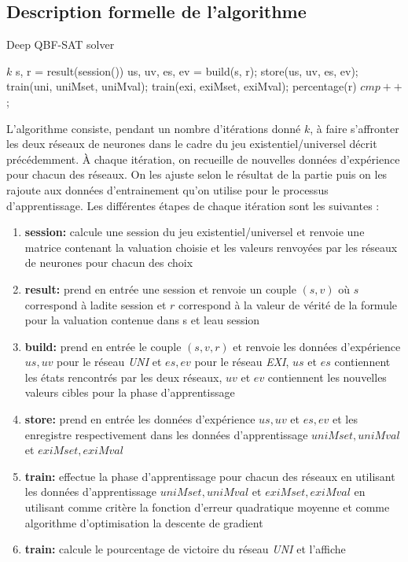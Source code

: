 \documentclass{article}
\begin{document}
\subsection{Description formelle de l'algorithme}
	\begin{algorithm}
	\caption{Deep QBF-SAT solver}
	\begin{algorithmic}
	\REQUIRE  $k$ 
	\STATE  s, r = result(session())
	\STATE  us, uv, es, ev = build(s, r);
	\STATE store(us, uv, es, ev);
	\STATE train(uni, uniMset, uniMval);
	\STATE train(exi, exiMset, exiMval);
	\STATE percentage(r)
	\STATE $cmp++$;
	\ENDWHILE
	\end{algorithmic}
	\end{algorithm}
	L'algorithme consiste, pendant un nombre d'itérations donné $k$, à faire s'affronter les deux réseaux de neurones dans le cadre du jeu existentiel/universel décrit précédemment. À chaque itération, on recueille de nouvelles données d'expérience pour chacun des réseaux. On les ajuste selon le résultat de la partie puis on les rajoute aux données d'entrainement qu'on utilise pour le processus d'apprentissage.
	Les différentes étapes de chaque itération sont les suivantes :
	\begin{enumerate}
	\item \textbf{session:} calcule une session du jeu existentiel/universel et renvoie une matrice contenant la valuation choisie et les valeurs renvoyées par les réseaux de neurones pour chacun des choix
	\item \textbf{result:} prend en entrée une session et renvoie un couple $(s,v)$ où $s$ correspond à ladite session et $r$ correspond à la valeur de vérité de la formule pour la valuation contenue dans s et leau session
	\item \textbf{build:} prend en entrée le couple $(s,v,r)$ et renvoie les données d'expérience $us,uv$ pour le réseau \textit{UNI} et $es,ev$ pour le réseau \textit{EXI}, $us$ et $es$ contiennent les états rencontrés par les deux réseaux, $uv$ et $ev$ contiennent les nouvelles valeurs cibles pour la phase d'apprentissage
	\item \textbf{store:} prend en entrée les données d'expérience $us,uv$ et $es,ev$ et les enregistre respectivement dans les données d'apprentissage $uniMset, uniMval$ et $exiMset, exiMval$  
	\item \textbf{train:} effectue la phase d'apprentissage pour chacun des réseaux en utilisant les données d'apprentissage $uniMset, uniMval$ et $exiMset, exiMval$ en utilisant comme critère la fonction d'erreur quadratique moyenne et comme algorithme d'optimisation la descente de gradient
	\item \textbf{train:} calcule le pourcentage de victoire du réseau \textit{UNI} et l'affiche
	\end{enumerate}
	
\end{document}
